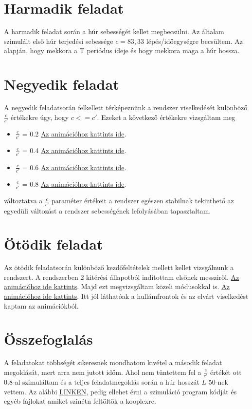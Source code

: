 \documentclass{article}[18pt]
\begin{document}
\section{Harmadik feladat}
A harmadik feladat során a húr sebességét kellet megbecsülni. Az általam szimulált első húr terjedési sebessége $c=83,33$ lépés/időegységre becsültem. Az alapján, hogy mekkora a T periódus ideje és hogy mekkora maga a húr hossza.
\newpage
\section{Negyedik feladat}
A negyedik feladatsorán felkellett térképeznünk a rendszer viselkedését különböző $\frac{c}{c'}$ értékekre úgy, hogy $c<=c'$. Ezeket a következő értékekre vizsgáltam meg
\begin{itemize}
    \item $\frac{c}{c'}$ = 0.2 \href{https://gph.is/g/amMwwBQ}{Az animációhoz kattints ide}.
    \item $\frac{c}{c'}$ = 0.4 \href{https://gph.is/g/ZygmmLO}{Az animációhoz kattints ide}.
    \item $\frac{c}{c'}$ = 0.6 \href{https://gph.is/g/4M6j2WA}{Az animációhoz kattints ide}.
    \item $\frac{c}{c'}$ = 0.8 \href{https://gph.is/g/E3XoDgL}{Az animációhoz kattints ide}.
\end{itemize}
változtatva a $\frac{c}{c'}$ paraméter értékeit a rendszer egészen stabilnak tekinthető az egyedüli változást a rendszer sebességének lefolyásában tapasztaltam.

\section{Ötödik feladat}

Az ötödik feladatsorán különböző kezdőfeltételek mellett kellet vizsgálnunk a rendszert.
A rendszerben 2 kitérési állapotból indítottam elsőnek messziről. \href{https://gph.is/g/ZP8A2Jr}{Az animációhoz ide kattints}.
Majd ezt megvizsgáltam közeli módusokkal is. \href{https://gph.is/g/aX8M2WO}{Az animációhoz ide kattints}.
Itt jól láthatóak a hullámfrontok és az elvárt viselkedést kaptam az animációkból.

\section{Összefoglalás}
A feladatokat többségét sikeresnek mondhatom kivétel a második feladat megoldását, mert arra nem jutott időm. Ahol nem tüntettem fel a $\frac{c}{c'}$ értékét ott 0.8-al szimuláltam és a teljes feladatmegoldás során a húr hosszát $L$ 50-nek vettem. Az alábbi \href{https://github.com/W0pkr1/1D_String.git}{LINKEN}, pedig ellehet érni a szimuláció program kódját és egyéb fájlokat amiket szinétn feltöltök a kooplexre.
\end{document}
